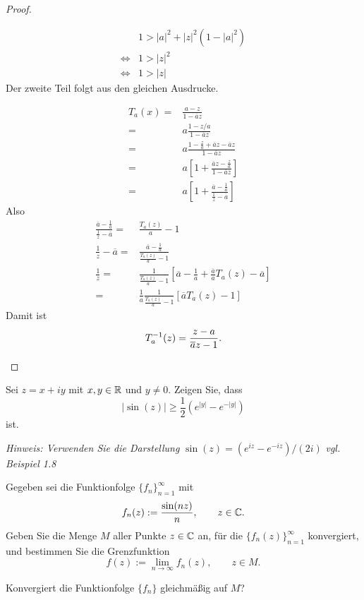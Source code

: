 \begin{proof}
\begin{parts}
\begin{align*}
			&1>|a|^2+|z|^2(1-|a|^2)\\
			\iff&1>|z|^2\\
			\iff& 1>|z|
		\end{align*}
		Der zweite Teil folgt aus den gleichen Ausdrucke.
	\item 
\begin{align*}
			T_a(x)=&\frac{a-z}{1-\overline{a}z}\\
			=& a \frac{1-z / a}{1-\overline{a}z}\\
			=&a \frac{1-\frac{z}{a}+\overline{a}z-\overline{a}z}{1-\overline{a}z}\\
			=&a\left[ 1+ \frac{\overline{a}z-\frac{z}{a}}{1-\overline{a}z} \right]\\
			=&a\left[ 1+\frac{\overline{a}-\frac{1}{a}}{\frac{1}{z}-\overline{a}} \right] 
		\end{align*}
		Also
		\begin{align*}
			\frac{\overline{a}-\frac{1}{a}}{\frac{1}{z}-\overline{a}}=& \frac{T_a(z)}{a}-1\\
			\frac{1}{z}-\overline{a}=&\frac{\overline{a}-\frac{1}{a}}{\frac{T_a(z)}{a}-1}\\
			\frac{1}{z}=&\frac{1}{\frac{T_a(z)}{a}-1}\left[ \overline{a}-\frac{1}{a}+\frac{\overline{a}}{a}T_a(z)-\overline{a} \right] \\
			=&\frac{1}{a}\frac{1}{\frac{T_a(z)}{a}-1}\left[ \overline{a}T_a(z)-1 \right] 
		\end{align*}
		Damit ist
		\[
		T_a^{-1}(z)=\frac{z-a}{\overline{a}z-1}
		.\qedhere\] 
	\end{parts}
\end{proof}
\begin{Problem}
	\begin{parts}
	\item Sei $z=x+iy$ mit $x,y\in \mathbb{R}$ und $y\neq 0$. Zeigen Sie, dass
		\[
		|\sin(z)|\ge \frac{1}{2}(e^{|y|}-e^{-|y|})
		\]
		ist.

		{\footnotesize \emph{Hinweis: Verwenden Sie die Darstellung }$\sin(z)=(e^{iz}-e^{-iz}) / (2i)$ \emph{vgl. Beispiel 1.8}}
	\item Gegeben sei die Funktionfolge $\{f_n\}_{n=1}^\infty$ mit
		\[
		f_n(z):=\frac{\sin(nz)}{n},\qquad z\in \mathbb{C}.\] 
		Geben Sie die Menge $M$ aller Punkte $z\in \mathbb{C}$ an, f\"{u}r die $\{f_n(z)\}_{n=1}^\infty$ konvergiert, und bestimmen Sie die Grenzfunktion
		\[
		f(z):=\lim_{n \to \infty} f_n(z),\qquad z\in M
		.\] 
	\item Konvergiert die Funktionfolge $\{f_n\} $ gleichm\"{a}ßig auf $M$?
	\end{parts}
\end{Problem}

